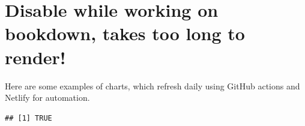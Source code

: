 \documentclass[
]{book}
\begin{document}
\hypertarget{disable-while-working-on-bookdown-takes-too-long-to-render}{%
\section{Disable while working on bookdown, takes too long to render!}\label{disable-while-working-on-bookdown-takes-too-long-to-render}}

Here are some examples of charts, which refresh daily using GitHub actions and Netlify for automation.

\begin{verbatim}
## [1] TRUE
\end{verbatim}

  
\end{document}
